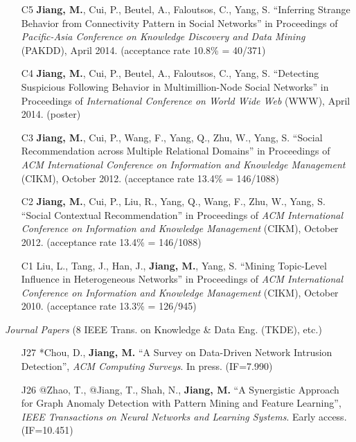 \documentclass[10pt]{article}
\newenvironment{myindentpar}[1]%
{\begin{list}{}%
         {\setlength{\leftmargin}{#1}}%
         \item[]%
}
{\end{list}}
\newcounter{list}
\begin{document}
\begin{myindentpar}{0.00cm}
\begin{enumerate}[leftmargin=.5cm]
\item[C5] \textbf{Jiang, M.}, Cui, P., Beutel, A., Faloutsos, C., Yang, S. ``Inferring Strange Behavior from Connectivity Pattern in Social Networks'' in Proceedings of \textit{Pacific-Asia Conference on Knowledge Discovery and Data Mining} (PAKDD), April 2014. (acceptance rate 10.8\% = 40/371)

\item[C4] \textbf{Jiang, M.}, Cui, P., Beutel, A., Faloutsos, C., Yang, S. ``Detecting Suspicious Following Behavior in Multimillion-Node Social Networks'' in Proceedings of \textit{International Conference on World Wide Web} (WWW), April 2014. (poster)

\item[C3] \textbf{Jiang, M.}, Cui, P., Wang, F., Yang, Q., Zhu, W., Yang, S. ``Social Recommendation across Multiple Relational Domains'' in Proceedings of \textit{ACM International Conference on Information and Knowledge Management} (CIKM), October 2012. (acceptance rate 13.4\% = 146/1088)

\item[C2] \textbf{Jiang, M.}, Cui, P., Liu, R., Yang, Q., Wang, F., Zhu, W., Yang, S. ``Social Contextual Recommendation'' in Proceedings of \textit{ACM International Conference on Information and Knowledge Management} (CIKM), October 2012. (acceptance rate 13.4\% = 146/1088)

\item[C1] Liu, L., Tang, J., Han, J., \textbf{Jiang, M.}, Yang, S. ``Mining Topic-Level Influence in Heterogeneous Networks'' in Proceedings of \textit{ACM International Conference on Information and Knowledge Management} (CIKM), October 2010. (acceptance rate 13.3\% = 126/945)

\end{enumerate}

\hspace{-0.25cm}\textit{Journal Papers} {\small (8 IEEE Trans. on Knowledge \& Data Eng. (TKDE), etc.)}

\begin{enumerate}[leftmargin=.5cm]

\item[J27] *Chou, D., \textbf{Jiang, M.} ``A Survey on Data-Driven Network Intrusion Detection'', \textit{ACM Computing Surveys}. In press. (IF=7.990)

\item[J26] @Zhao, T., @Jiang, T., Shah, N., \textbf{Jiang, M.} ``A Synergistic Approach for Graph Anomaly Detection with Pattern Mining and Feature Learning'', \textit{IEEE Transactions on Neural Networks and Learning Systems}. Early access. (IF=10.451)
	

\end{enumerate}
\end{myindentpar}
\end{document}
